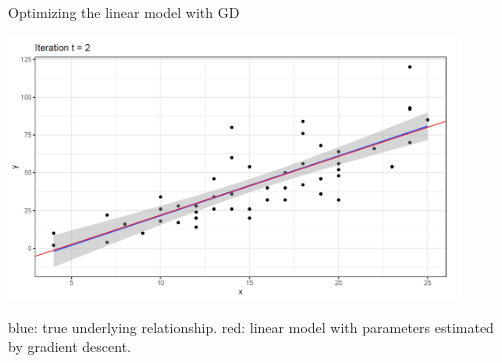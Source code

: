 \begin{vbframe}{Optimizing the linear model with GD}
	\begin{center}
	\includegraphics[width = 0.9\textwidth]{figure_man/solution03.png}\\
	\begin{footnotesize}
		blue: true underlying relationship. red: linear model with parameters estimated by gradient descent.
	\end{footnotesize}
	\end{center}

\end{vbframe}

\endlecture


